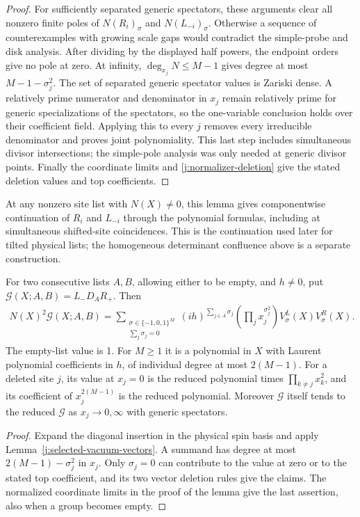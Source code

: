 \begin{proof}
For sufficiently separated generic spectators, these arguments clear
all nonzero finite poles of $N(R_i)_\sigma$ and $N(L_{-i})_\sigma$.
Otherwise a sequence of counterexamples with growing scale gaps
would contradict the simple-probe and disk analysis. After dividing
by the displayed half powers, the endpoint orders give no pole at
zero. At infinity, $\deg_{x_j}N\le M-1$ gives degree at most
$M-1-\sigma_j^2$. The set of separated generic spectator values is
Zariski dense. A relatively prime numerator and denominator in
$x_j$ remain relatively prime for generic specializations of the
spectators, so the one-variable conclusion holds over their
coefficient field. Applying this to every $j$ removes every
irreducible denominator and proves joint polynomiality. This last
step includes simultaneous divisor intersections; the simple-pole
analysis was only needed at generic divisor points. Finally the
coordinate limits and \eqref{j:normalizer-deletion} give the stated
deletion values and top coefficients.
\end{proof}

At any nonzero site list with $N(X)\ne0$, this lemma gives
componentwise continuation of $R_i$ and $L_{-i}$ through the
polynomial formulas, including at simultaneous shifted-site
coincidences. This is the continuation used later for tilted physical
lists; the homogeneous determinant confluence above is a separate
construction.

\begin{corollary}\label{j:scalar-vacuum-polynomial}
For two consecutive lists $A,B$, allowing either to be empty, and
$h\ne0$, put
$\mathscr G(X;A,B)=L_-D_A R_+$. Then
\[
\begin{split}
N(X)^2\mathscr G(X;A,B)
 =\sum_{\substack{\sigma\in\{-1,0,1\}^M\\ \sum_j\sigma_j=0}}
 (ih)^{\sum_{j\in A}\sigma_j}
 \left(\prod_jx_j^{\sigma_j^2}\right)
 V_\sigma^L(X)V_\sigma^R(X).
\end{split}
\]
The empty-list value is 1. For $M\ge1$ it is a polynomial in $X$ with
Laurent polynomial coefficients in $h$, of individual degree at most
$2(M-1)$. For a deleted site $j$,
its value at $x_j=0$ is the reduced polynomial times
$\prod_{k\ne j}x_k^2$, and its coefficient of $x_j^{2(M-1)}$ is
the reduced polynomial. Moreover $\mathscr G$ itself tends to the
reduced $\mathscr G$ as $x_j\to0,\infty$ with generic spectators.
\end{corollary}
\begin{proof}
Expand the diagonal insertion in the physical spin basis and apply
Lemma~\ref{j:selected-vacuum-vectors}. A summand has degree at most
$2(M-1)-\sigma_j^2$ in $x_j$. Only $\sigma_j=0$ can contribute
to the value at zero or to the stated top coefficient, and its two
vector deletion rules give the claims. The normalized coordinate
limits in the proof of the lemma give the last assertion, also when
a group becomes empty.
\end{proof}


